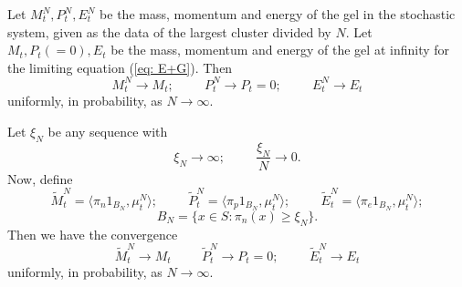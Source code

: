 \begin{theorem}\label{thrm: convergence of gel} Let $M^N_t, P^N_t, E^N_t$ be the mass, momentum and energy of the gel in the stochastic system, given as the data of the largest cluster divided by $N$. Let $M_t, P_t(=0), E_t$ be the mass, momentum and energy of the gel at infinity for the limiting equation (\ref{eq: E+G}). Then \begin{equation}
    M^N_t \rightarrow M_t; \hspace{1cm} P^N_t \rightarrow P_t=0; \hspace{1cm} E^N_t \rightarrow E_t
\end{equation}
 uniformly, in probability, as $N\rightarrow \infty.$ \end{theorem} \begin{theorem} \label{thrm: convergence of large clusters} Let $\xi_N$ be any sequence with \begin{equation}
     \xi_N\rightarrow \infty;\hspace{1cm} \frac{\xi_N}{N}\rightarrow 0.
 \end{equation} Now, define \begin{equation}
    \widetilde{M}^N_t=\langle \pi_n 1_{B_N}, \mu^N_t\rangle;\hspace{1cm}  \widetilde{P}^N_t=\langle \pi_p 1_{B_N}, \mu^N_t\rangle;\hspace{1cm} \widetilde{E}^N_t=\langle \pi_e 1_{B_N}, \mu^N_t\rangle;
\end{equation} \begin{equation}
    B_N=\{x\in S: \pi_n(x)\geq \xi_N\}.
\end{equation} Then we have the convergence \begin{equation}
    \widetilde{M}^N_t \rightarrow M_t 
\hspace{1cm}
    \widetilde{P}^N_t \rightarrow P_t=0;
\hspace{1cm}
    \widetilde{E}^N_t \rightarrow E_t 
\end{equation} uniformly, in probability, as $N\rightarrow \infty$.  \end{theorem}